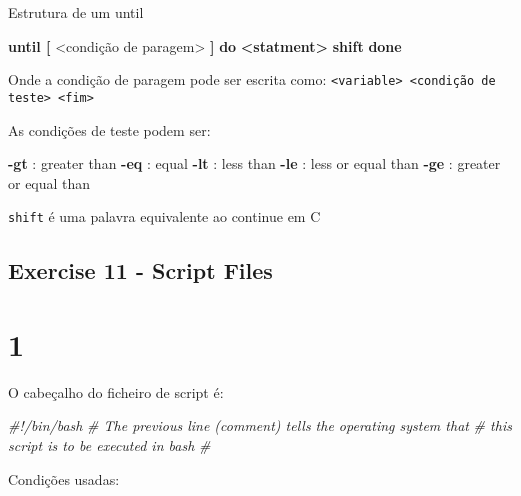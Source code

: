 \documentclass[]{article}
\newenvironment{Shaded}{}{}
\newcommand{\KeywordTok}[1]{\textcolor[rgb]{0.00,0.44,0.13}{\textbf{{#1}}}}
\newcommand{\CommentTok}[1]{\textcolor[rgb]{0.38,0.63,0.69}{\textit{{#1}}}}
\newcommand{\OtherTok}[1]{\textcolor[rgb]{0.00,0.44,0.13}{{#1}}}
\newcommand{\NormalTok}[1]{{#1}}
\begin{document}
Estrutura de um until

\begin{Shaded}
\begin{Highlighting}[]
\KeywordTok{until [} \NormalTok{<condição de paragem}\OtherTok{>}\KeywordTok{ ]}
\KeywordTok{do}
    \KeywordTok{<statment>}
    \KeywordTok{shift}
\KeywordTok{done} 
\end{Highlighting}
\end{Shaded}

Onde a condição de paragem pode ser escrita como:
\texttt{\textless{}variable\textgreater{} \textless{}condição de teste\textgreater{} \textless{}fim\textgreater{}}

As condições de teste podem ser:

\begin{Shaded}
\begin{Highlighting}[]
\KeywordTok{-gt} \NormalTok{: greater than}
\KeywordTok{-eq} \NormalTok{: equal}
\KeywordTok{-lt} \NormalTok{: less than}
\KeywordTok{-le} \NormalTok{: less or equal than}
\KeywordTok{-ge} \NormalTok{: greater or equal than}
\end{Highlighting}
\end{Shaded}

\texttt{shift} é uma palavra equivalente ao continue em C

\subsection{Exercise 11 - Script
Files}\label{exercise-11---script-files}

\section{1}\label{section-21}

O cabeçalho do ficheiro de script é:

\begin{Shaded}
\begin{Highlighting}[]
\CommentTok{#!/bin/bash}
\CommentTok{# The previous line (comment) tells the operating system that}
\CommentTok{#  this script is to be executed in bash}
\CommentTok{#}
\end{Highlighting}
\end{Shaded}

Condições usadas:

\begin{Shaded}
\end{Shaded}
\end{document}
